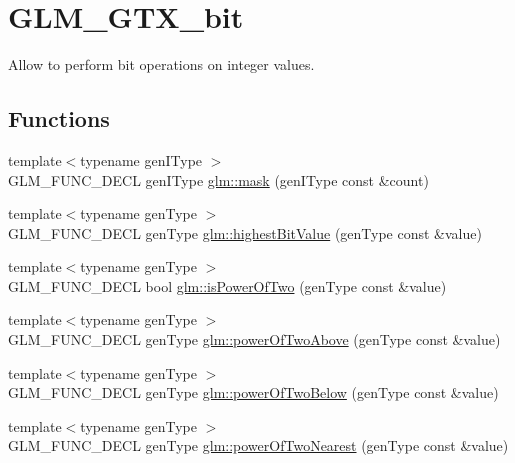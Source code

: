 \hypertarget{group__gtx__bit}{}\section{G\+L\+M\+\_\+\+G\+T\+X\+\_\+bit}
\label{group__gtx__bit}


Allow to perform bit operations on integer values.  


\subsection*{Functions}
\begin{DoxyCompactItemize}
\item 
{\footnotesize template$<$typename gen\+I\+Type $>$ }\\G\+L\+M\+\_\+\+F\+U\+N\+C\+\_\+\+D\+E\+CL gen\+I\+Type \hyperlink{group__gtx__bit_ga79f1482a09c91f785e7e0ea8aed2b20e}{glm\+::mask} (gen\+I\+Type const \&count)
\item 
{\footnotesize template$<$typename gen\+Type $>$ }\\G\+L\+M\+\_\+\+F\+U\+N\+C\+\_\+\+D\+E\+CL gen\+Type \hyperlink{group__gtx__bit_ga9621840252c293918780bc3890374b86}{glm\+::highest\+Bit\+Value} (gen\+Type const \&value)
\item 
{\footnotesize template$<$typename gen\+Type $>$ }\\G\+L\+M\+\_\+\+F\+U\+N\+C\+\_\+\+D\+E\+CL bool \hyperlink{group__gtx__bit_ga5ddca7546d8be35992eedd3411842545}{glm\+::is\+Power\+Of\+Two} (gen\+Type const \&value)
\item 
{\footnotesize template$<$typename gen\+Type $>$ }\\G\+L\+M\+\_\+\+F\+U\+N\+C\+\_\+\+D\+E\+CL gen\+Type \hyperlink{group__gtx__bit_gaa49786cf3f8a1f65de6e70b6088a811e}{glm\+::power\+Of\+Two\+Above} (gen\+Type const \&value)
\item 
{\footnotesize template$<$typename gen\+Type $>$ }\\G\+L\+M\+\_\+\+F\+U\+N\+C\+\_\+\+D\+E\+CL gen\+Type \hyperlink{group__gtx__bit_gaeceaea338213cbff7a275460e35e8d0c}{glm\+::power\+Of\+Two\+Below} (gen\+Type const \&value)
\item 
{\footnotesize template$<$typename gen\+Type $>$ }\\G\+L\+M\+\_\+\+F\+U\+N\+C\+\_\+\+D\+E\+CL gen\+Type \hyperlink{group__gtx__bit_ga9e68299f4ca0cd6674efbee62d425b95}{glm\+::power\+Of\+Two\+Nearest} (gen\+Type const \&value)
\item 

\end{DoxyCompactItemize}
